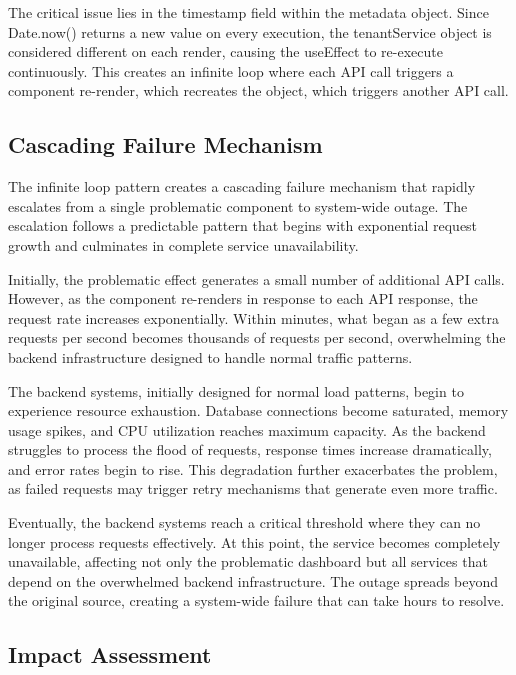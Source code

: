 \documentclass[10pt]{article}
\begin{document}
The critical issue lies in the timestamp field within the metadata object. Since Date.now() returns a new value on every execution, the tenantService object is considered different on each render, causing the useEffect to re-execute continuously. This creates an infinite loop where each API call triggers a component re-render, which recreates the object, which triggers another API call.

\subsection{Cascading Failure Mechanism}

The infinite loop pattern creates a cascading failure mechanism that rapidly escalates from a single problematic component to system-wide outage. The escalation follows a predictable pattern that begins with exponential request growth and culminates in complete service unavailability.

Initially, the problematic effect generates a small number of additional API calls. However, as the component re-renders in response to each API response, the request rate increases exponentially. Within minutes, what began as a few extra requests per second becomes thousands of requests per second, overwhelming the backend infrastructure designed to handle normal traffic patterns.

The backend systems, initially designed for normal load patterns, begin to experience resource exhaustion. Database connections become saturated, memory usage spikes, and CPU utilization reaches maximum capacity. As the backend struggles to process the flood of requests, response times increase dramatically, and error rates begin to rise. This degradation further exacerbates the problem, as failed requests may trigger retry mechanisms that generate even more traffic.

Eventually, the backend systems reach a critical threshold where they can no longer process requests effectively. At this point, the service becomes completely unavailable, affecting not only the problematic dashboard but all services that depend on the overwhelmed backend infrastructure. The outage spreads beyond the original source, creating a system-wide failure that can take hours to resolve.

\subsection{Impact Assessment}
\end{document}
